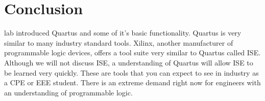   \section{Conclusion}
     lab introduced Quartus and some of it's basic functionality. Quartus is very similar to many industry standard tools. Xilinx, another manufacturer of programmable logic devices, offers a tool suite very similar to Quartus called ISE. Although we will not discuss ISE, a understanding of Quartus will allow ISE to be learned very quickly. These are tools that you can expect to see in industry as a CPE or EEE student. There is an extreme demand right now for engineers with an understanding of programmable logic.

  

